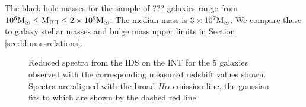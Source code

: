The black hole masses for the sample of ??? galaxies range from {\notebsm $10^6 \rm{M}_{\odot} \leq M_{\rm BH} \leq 2 \times 10^9 \rm{M}_{\odot}$. The median mass is $3 \times 10^7 \rm{M}_{\odot}$}. We compare these to galaxy stellar masses and bulge mass upper limits in Section \ref{sec:bhmassrelations}.






\begin{figure}
\caption[Zoom in on $H\alpha$ region of the spectra of 5 galaxies observed with the IDS on the INT]{
Reduced spectra from the IDS on the INT for the 5 galaxies observed with the corresponding measured redshift values shown. Spectra are aligned with the broad $H\alpha$ emission line, the gaussian fits to which are shown by the dashed red line.  
}
\label{fig:zoomspectra}
\end{figure}
